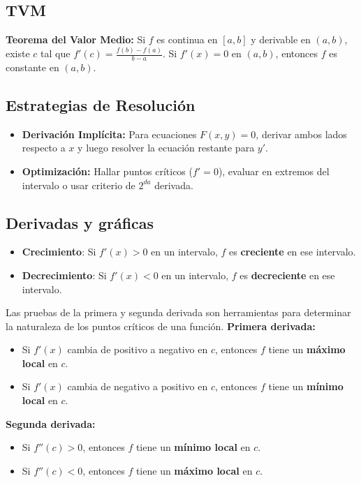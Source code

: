 \documentclass[a4paper,12pt]{article}
\theoremstyle{definition}
\begin{document}
\subsection{TVM}
\textbf{Teorema del Valor Medio:} Si $f$ es continua en $[a,b]$ y derivable en $(a,b)$, existe $c$ tal que $f'(c) = \frac{f(b)-f(a)}{b-a}$. Si $f'(x) = 0$ en $(a,b)$, entonces $f$ es constante en $(a,b)$.

\subsection{Estrategias de Resolución}
\begin{itemize}
    \item \textbf{Derivación Implícita:} Para ecuaciones $F(x,y)=0$, derivar ambos lados respecto a $x$ y luego resolver la ecuación restante para $y'$.
    \item \textbf{Optimización:} Hallar puntos críticos ($f'=0$), evaluar en extremos del intervalo o usar criterio de $2^{da}$ derivada.
\end{itemize}

\subsection{Derivadas y gráficas}
\begin{itemize}
    \item \textbf{Crecimiento}: Si $f'(x) > 0$ en un intervalo, $f$ es \textbf{creciente} en ese intervalo.
    \item \textbf{Decrecimiento}: Si $f'(x) < 0$ en un intervalo, $f$ es \textbf{decreciente} en ese intervalo.
\end{itemize}

\begin{tcolorbox}[title=Prueba de la primera y segunda derivada]
    Las pruebas de la primera y segunda derivada son herramientas para determinar la naturaleza de los puntos críticos de una función. \newline
    \textbf{Primera derivada:}
\begin{itemize}
    \item Si $f'(x)$ cambia de positivo a negativo en $c$, entonces $f$ tiene un \textbf{máximo local} en $c$.
    \item Si $f'(x)$ cambia de negativo a positivo en $c$, entonces $f$ tiene un \textbf{mínimo local} en $c$.
\end{itemize}
    \textbf{Segunda derivada:}
    \begin{itemize}
    \item Si $f''(c) > 0$, entonces $f$ tiene un \textbf{mínimo local} en $c$.
    \item Si $f''(c) < 0$, entonces $f$ tiene un \textbf{máximo local} en $c$.
\end{itemize}
\end{tcolorbox}
\end{document}
